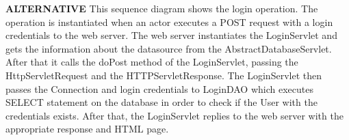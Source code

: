 \textbf{ALTERNATIVE}
This sequence diagram shows the login operation. The operation is instantiated when an actor executes a POST request with a login credentials to the web server. The web server instantiates the LoginServlet and gets the information about the datasource from the AbstractDatabaseServlet. After that it calls the doPost method of the LoginServlet, passing the HttpServletRequest and the HTTPServletResponse. The LoginServlet then passes the Connection and login credentials to LoginDAO which executes SELECT statement on the database in order to check if the User with the credentials exists. After that, the LoginServlet replies to the web server with the appropriate response and HTML page.